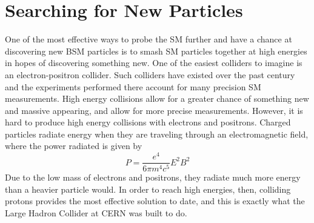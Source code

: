 \chapter{Searching for New Particles}\label{Sec:CMS}

One of the most effective ways to probe the SM further and have a chance at discovering new BSM particles is to smash SM particles together at high energies in hopes of discovering something new. One of the easiest colliders to imagine is an electron-positron collider. Such colliders have existed over the past century and the experiments performed there account for many precision SM measurements. High energy collisions allow for a greater chance of something new and massive appearing, and allow for more precise measurements. However, it is hard to produce high energy collisions with electrons and positrons. Charged particles radiate energy when they are traveling through an electromagnetic field, where the power radiated is given by
\begin{equation}\label{Eq:SynchRad}
   P = \frac{e^4}{6\pi m^4c^5}E^2B^2
\end{equation}
Due to the low mass of electrons and positrons, they radiate much more energy than a heavier particle would. In order to reach high energies, then, colliding protons provides the most effective solution to date, and this is exactly what the Large Hadron Collider at CERN was built to do.
\vspace{5mm}


